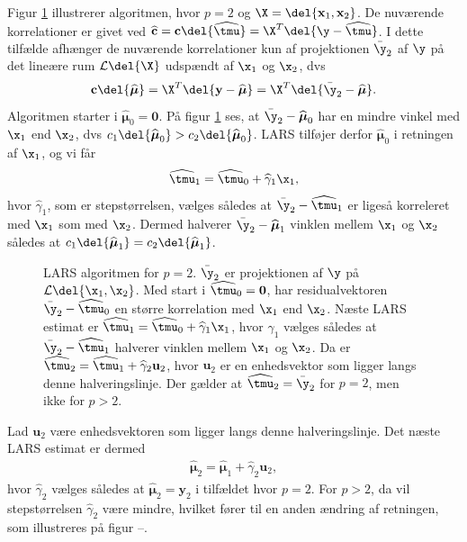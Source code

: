 Figur \ref{fig:lars} illustrerer algoritmen, hvor $p = 2$ og $\X = \del{\textbf{x}_1, \textbf{x}_2}$.
De nuværende korrelationer er givet ved \(\widehat{\mathbf{c}} = \mathbf{c} \del{\widehat{\tmu}} = \X^T \del{\y - \widehat{\tmu}}\).
I dette tilfælde afhænger de nuværende korrelationer kun af projektionen \(\bar{\y}_2\) af \(\y\) på det lineære rum $\mathcal{L} \del{\X}$ udspændt af \(\x_1\) og \(\x_2\), dvs 
\begin{align*}
\textbf{c}\del{\boldsymbol{\widehat{\mu}}} = \X^T\del{\textbf{y} - \widehat{\boldsymbol{\mu}}} = \X^T \del{ \bar{\y}_2 - \boldsymbol{\widehat{\mu}}}.
\end{align*}
Algoritmen starter i $\widehat{\boldsymbol{\mu}}_0 = \textbf{0}$.
På figur \ref{fig:lars} ses, at \(\bar{\y}_2 - \widehat{\boldsymbol{\mu}}_0\) har en mindre vinkel med \(\x_1\) end \(\x_2\), dvs \(c_1 \del{\widehat{\boldsymbol{\mu}}_0} > c_2 \del{\widehat{\boldsymbol{\mu}}_0}\).
LARS tilføjer derfor \(\widehat{\boldsymbol{\mu}}_0\) i retningen af \(\x_1\), og vi får
\begin{align*}
\widehat{\tmu}_1 = \widehat{\tmu}_0 + \widehat{\gamma}_1 \x_1,
\end{align*}
hvor \(\widehat{\gamma}_1\), som er stepstørrelsen, vælges således at  \(\bar{\y}_2 - \widehat{\tmu}_1\) er ligeså korreleret med \(\x_1\) som med \(\x_2\).
Dermed halverer \(\bar{\y}_2 - \widehat{\boldsymbol{\mu}}_1\) vinklen mellem \(\x_1\) og \(\x_2\) således at \(c_1 \del{\widehat{\boldsymbol{\mu}}_1} = c_2 \del{\widehat{\boldsymbol{\mu}}_1}\).
%
\begin{figure}[H]
\centering
\scalebox{0.8}{}
\caption{LARS algoritmen for \(p=2\). \(\bar{\y}_2\) er projektionen af \(\y\) på \(\mathcal{L} \del{\x_1, \x_2}\).
Med start i \(\widehat{\tmu}_0=\mathbf{0}\), har residualvektoren \(\bar{\y}_2 - \widehat{\tmu}_0\) en større korrelation med \(\x_1\) end \(\x_2\). Næste LARS estimat er \(\widehat{\tmu}_1 = \widehat{\tmu}_0 + \widehat{\gamma}_1 \x_1\), hvor \(\widehat{\gamma}_1\) vælges således at \(\bar{\y}_2 - \widehat{\tmu}_1\) halverer vinklen mellem \(\x_1\) og \(\x_2\). Da er \(\widehat{\tmu}_2 = \widehat{\tmu}_1 + \widehat{\gamma}_2 \mathbf{u}_2\), hvor \(\mathbf{u}_2\) er en enhedsvektor som ligger langs denne halveringslinje.
Der gælder at \(\widehat{\tmu}_2 = \bar{\y}_2\) for \(p=2\), men ikke for \(p>2\).
 }\label{fig:lars}
\end{figure}
%
Lad $\mathbf{u}_2$ være enhedsvektoren som ligger langs denne halveringslinje.
Det næste LARS estimat er dermed
\begin{align*}
\widehat{\boldsymbol{\mu}}_2 = \widehat{\boldsymbol{\mu}}_1+ \widehat{\gamma}_2 \mathbf{u}_2,
\end{align*}
hvor $\widehat{\gamma}_2$ vælges således at $\widehat{\boldsymbol{\mu}}_2 = \textbf{y}_2$ i tilfældet hvor $p = 2$. 
For \(p>2\), da vil stepstørrelsen \(\widehat{\gamma}_2\) være mindre, hvilket fører til en anden ændring af retningen, som illustreres på figur --.

